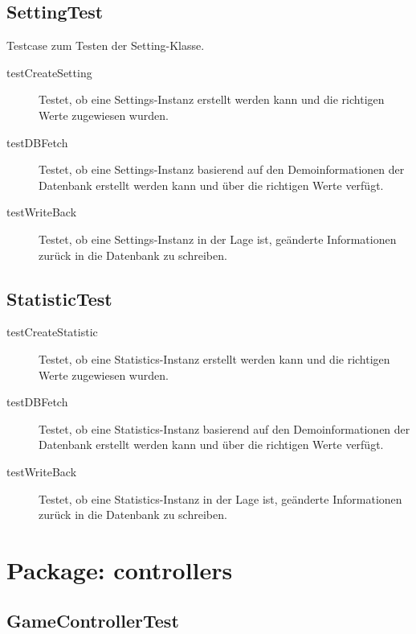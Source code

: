 \documentclass[parskip=full]{scrreprt}
\begin{document}
\subsection{SettingTest}

Testcase zum Testen der Setting-Klasse.

\begin{description}
	\item[testCreateSetting] Testet, ob eine Settings-Instanz erstellt werden kann und die richtigen Werte zugewiesen wurden.
	\item[testDBFetch] Testet, ob eine Settings-Instanz basierend auf den Demoinformationen der Datenbank erstellt werden kann und über die richtigen Werte verfügt.
	\item[testWriteBack] Testet, ob eine Settings-Instanz in der Lage ist, geänderte Informationen zurück in die Datenbank zu schreiben.
\end{description}

\subsection{StatisticTest}

\begin{description}
	\item[testCreateStatistic] Testet, ob eine Statistics-Instanz erstellt werden kann und die richtigen Werte zugewiesen wurden.
	\item[testDBFetch] Testet, ob eine Statistics-Instanz basierend auf den Demoinformationen der Datenbank erstellt werden kann und über die richtigen Werte verfügt.
	\item[testWriteBack] Testet, ob eine Statistics-Instanz in der Lage ist, geänderte Informationen zurück in die Datenbank zu schreiben.
\end{description}

\clearpage

\section{Package: controllers}

\subsection{GameControllerTest}

\begin{description}
	\item 
\end{description}
\end{document}
